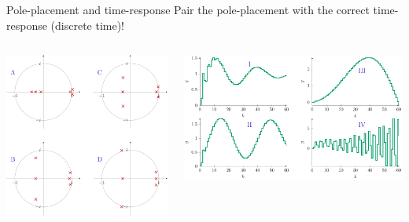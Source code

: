 \documentclass[presentation,aspectratio=169]{beamer}
\begin{document}
\begin{frame}[label={sec:org668312d}]{Pole-placement and time-response}
Pair the pole-placement with the correct time-response (discrete time)!
\begin{columns}
\begin{column}{0.4\columnwidth}
\begin{center}
\includegraphics[width=\linewidth]{../../figures/pzmap-discrete-apollo}
\end{center}
\end{column}
\begin{column}{0.6\columnwidth}
\begin{center}
\includegraphics[width=\linewidth]{../../figures/step-reponse-discrete-apollo}
\end{center}
\end{column}
\end{columns}
\end{frame}
\end{document}
